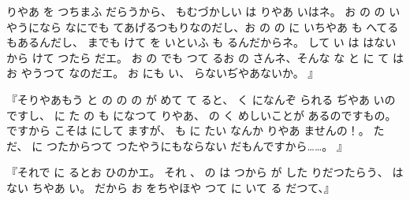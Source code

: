 りやあ
を
つちまふ
だらうから、
もむづかしい
は
りやあ
いはネ。
お
の
の
いやうになら
なにでも
てあげるつもりなのだし、お
の
の
に
いちやあ
も
へてる
もあるんだし、
までも
けて
を
いといふ
も
るんだからネ。
して
い
は
はないから
けて
つたら
だエ。
お
の
でも
つて
るお
の
さんネ、そんな
な
と
に
て
はお
やうつて
なのだエ。
お
にも
い、
らないぢやあないか。
』

『そりやあもう
と
の
の
の
が
めて
て
ると、
く
になんぞ
られる
ぢやあ
いのですし、
に
た
の
も
になつて
りやあ、
の
く
めしいことが
あるのですもの。
ですから
こそは
にして
ますが、
も
に
たい
なんか
りやあ
ませんの！。
ただ、
に
つたからつて
つたやうにもならない
だもんですから……。
』

『それで
に
るとお
ひのかエ。
それ
、
の
は
つから
が
した
りだつたらう、
はない
ちやあ
い。
だから
お
をちやほや
つて
に
いて
る
だつて、』

